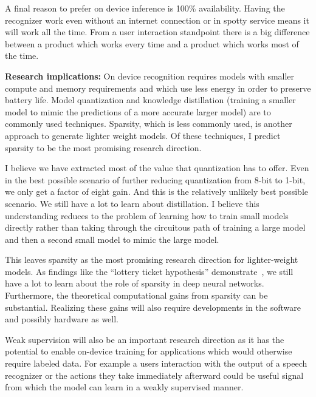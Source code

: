 A final reason to prefer on device inference is 100\% availability. Having the
recognizer work even without an internet connection or in spotty service means
it will work all the time. From a user interaction standpoint there is a big
difference between a product which works every time and a product which works
most of the time.

{\bf Research implications:} On device recognition requires models with smaller
compute and memory requirements and which use less energy in order to preserve
battery life. Model quantization and knowledge distillation (training a smaller
model to mimic the predictions of a more accurate larger model) are to commonly
used techniques. Sparsity, which is less commonly used, is another approach to
generate lighter weight models. Of these techniques, I predict sparsity to be
the most promising research direction.

I believe we have extracted most of the value that quantization has to offer.
Even in the best possible scenario of further reducing quantization from 8-bit
to 1-bit, we only get a factor of eight gain. And this is the relatively
unlikely best possible scenario. We still have a lot to learn about
distillation. I believe this understanding reduces to the problem of learning
how to train small models directly rather than taking through the circuitous
path of training a large model and then a second small model to mimic the large
model.

This leaves sparsity as the most promising research direction for
lighter-weight models. As findings like the ``lottery ticket hypothesis''
demonstrate~\citep{frankle2018lottery}, we still have a lot to learn about the
role of sparsity in deep neural networks. Furthermore, the theoretical
computational gains from sparsity can be substantial. Realizing these gains
will also require developments in the software and possibly hardware as well.

Weak supervision will also be an important research direction as it has the
potential to enable on-device training for applications which would otherwise
require labeled data. For example a users interaction with the output of a
speech recognizer or the actions they take immediately afterward could be
useful signal from which the model can learn in a weakly supervised manner.


